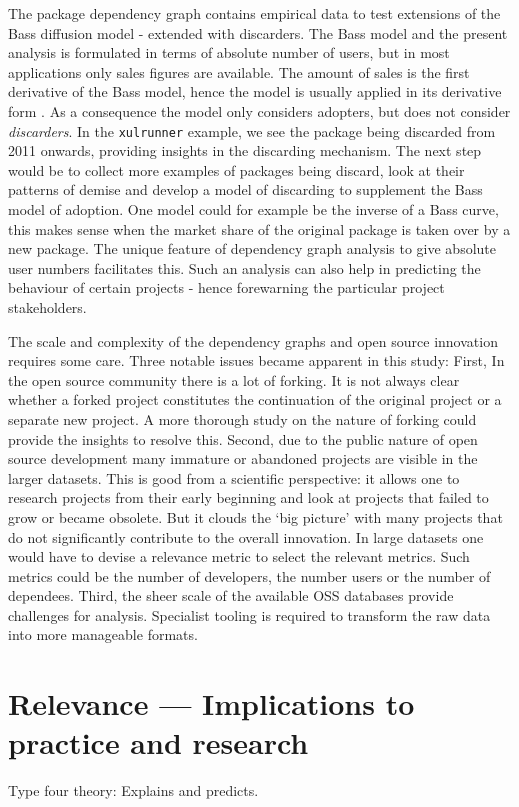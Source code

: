 \documentclass[smallextended,final]{svjour3}
\begin{document}
The package dependency graph contains empirical data to test extensions of the Bass diffusion model - extended with discarders. The Bass model and the present analysis is formulated in terms of absolute number of users, but in most applications only sales figures are available. The amount of sales is the first derivative of the Bass model, hence the model is usually applied in its derivative form \citep{mahajan95}. As a consequence the model only considers adopters, but does not consider \emph{discarders}. In the \verb|xulrunner| example, we see the package being discarded from 2011 onwards, providing insights in the discarding mechanism. The next step would be to collect more examples of packages being discard, look at their patterns of demise and develop a model of discarding to supplement the Bass model of adoption. One model could for example be the inverse of a Bass curve, this makes sense when the market share of the original package is taken over by a new package. The unique feature of dependency graph analysis to give absolute user numbers facilitates this. Such an analysis can also help in predicting the behaviour of certain projects - hence forewarning the particular project stakeholders.

The scale and complexity of the dependency graphs and open source innovation requires some care. Three notable issues became apparent in this study: First, In the open source community there is a lot of forking. It is not always clear whether a forked project constitutes the continuation of the original project or a separate new project. A more thorough study on the nature of forking could provide the insights to resolve this. Second, due to the public nature of open source development many immature or abandoned projects are visible in the larger datasets. This is good from a scientific perspective: it allows one to research projects from their early beginning and look at projects that failed to grow or became obsolete. But it clouds the `big picture' with many projects that do not significantly contribute to the overall innovation. In large datasets one would have to devise a relevance metric to select the relevant metrics. Such metrics could be the number of developers, the number users or the number of dependees. Third, the sheer scale of the available OSS databases provide challenges for analysis. Specialist tooling is required to transform the raw data into more manageable formats.

\section{Relevance — Implications to practice and research}

Type four theory: Explains and predicts.



\end{document}
